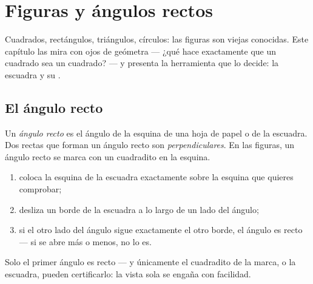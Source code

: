 \chapter{Figuras y ángulos rectos}\label{ch:g3:shapes}

Cuadrados, rectángulos, triángulos, círculos: las figuras son viejas conocidas.
Este capítulo las mira con ojos de geómetra --- ¿qué hace exactamente
que un cuadrado sea un cuadrado? --- y presenta la herramienta que lo decide:
la escuadra y su .

\section{El ángulo recto}

\begin{definition}\label{def:g3:shapes:rightangle}
Un \emph{ángulo recto} es el ángulo de la esquina de una
hoja de papel o de la escuadra. Dos rectas que forman un ángulo recto
son \emph{perpendiculares}. En las figuras, un ángulo recto se marca con un
cuadradito en la esquina.
\end{definition}

\begin{method}\label{met:g3:shapes:check}
\begin{enumerate}
  \item coloca la esquina de la escuadra exactamente sobre la esquina que
        quieres comprobar;
  \item desliza un borde de la escuadra a lo largo de un lado del ángulo;
  \item si el otro lado del ángulo sigue exactamente el otro
        borde, el ángulo es recto --- si se abre más o menos,
        no lo es.
\end{enumerate}
\end{method}

\begin{omfigure}

{\small Solo el primer ángulo es recto --- y únicamente el cuadradito
de la marca, o la escuadra, pueden certificarlo: la vista sola se engaña
con facilidad.}
\end{omfigure}

